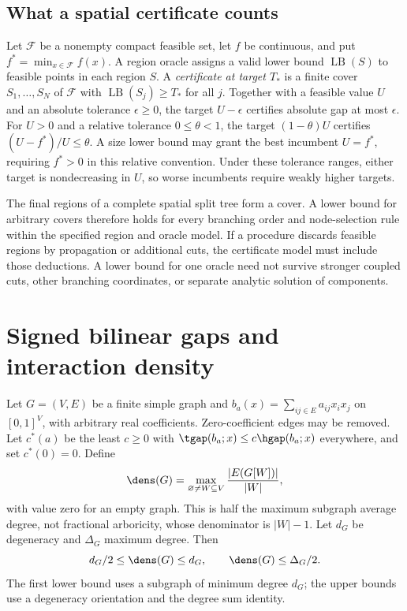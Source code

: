 \subsection{What a spatial certificate counts}\label{subsec:certificate-model}
Let $\mathcal F$ be a nonempty compact feasible set, let $f$ be continuous,
and put $f^*=\min_{x\in\mathcal F}f(x)$. A region oracle assigns a valid
lower bound $\operatorname{LB}(S)$ to feasible points in each region $S$.
A \emph{certificate at target $T_*$} is a finite cover $S_1,\ldots,S_N$
of $\mathcal F$ with $\operatorname{LB}(S_j)\ge T_*$ for all $j$.
Together with a feasible value $U$ and an absolute tolerance $\epsilon\ge0$,
the target $U-\epsilon$ certifies absolute gap at most $\epsilon$.
For $U>0$ and a relative tolerance $0\le\theta<1$, the target
$(1-\theta)U$ certifies $(U-f^*)/U\le\theta$. A size lower bound may
grant the best incumbent $U=f^*$, requiring $f^*>0$ in this relative
convention. Under these tolerance ranges, either target is nondecreasing
in $U$, so worse incumbents require weakly higher targets.

The final regions of a complete spatial split tree form a cover. A lower
bound for arbitrary covers therefore holds for every branching order and
node-selection rule within the specified region and oracle model. If a
procedure discards feasible regions by propagation or additional cuts,
the certificate model must include those deductions. A lower bound for one
oracle need not survive stronger coupled cuts, other branching
coordinates, or separate analytic solution of components.

\section{Signed bilinear gaps and interaction density}\label{sec:bilinear}
Let $G=(V,E)$ be a finite simple graph and
$b_a(x)=\sum_{ij\in E}a_{ij}x_ix_j$ on $[0,1]^V$, with arbitrary real
coefficients. Zero-coefficient edges may be removed. Let $c^*(a)$ be the
least $c\ge0$ with $\tgap(b_a;x)\le c\hgap(b_a;x)$ everywhere, and set
$c^*(0)=0$. Define
\begin{equation}\label{eq:density-definition}
 \dens(G)=\max_{\varnothing\ne W\subseteq V}\frac{|E(G[W])|}{|W|},
\end{equation}
with value zero for an empty graph. This is half the maximum subgraph
average degree, not fractional arboricity, whose denominator is $|W|-1$.
Let $d_G$ be degeneracy and $\Delta_G$ maximum degree. Then
\begin{equation}\label{eq:density-comparisons}
 d_G/2\le\dens(G)\le d_G,\qquad \dens(G)\le\Delta_G/2.
\end{equation}
The first lower bound uses a subgraph of minimum degree $d_G$; the upper
bounds use a degeneracy orientation and the degree sum identity.

